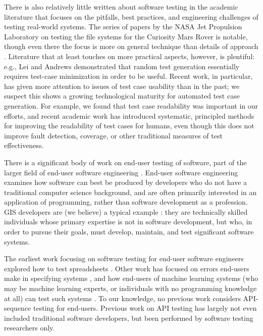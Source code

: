 There is also relatively little written about software testing in the
academic literature that focuses on the pitfalls, best practices, and
engineering challenges of testing real-world systems.  The series of
papers by the NASA Jet Propulsion Laboratory on testing the file
systems for the Curiosity Mars Rover is notable, though even there the
focus is more on general technique than details of approach
\cite{ICSEDiff,CFV08,AMAI}.  Literature that at least touches on more
practical aspects, however, is plentiful: e.g., Lei and Andrews
\cite{MinUnit} demonstrated that random test generation essentially
requires test-case minimization \cite{DD} in order to be useful.
Recent work, in particular, has given more attention to issues of test case usability
than in the past; we suspect this shows a growing technological
maturity for automated test case generation.  For example, we found
that test case readability was important in our efforts, and recent
academic work \cite{Readable,Guava} has introduced systematic,
principled methods for improving the readability of test cases for
humans, even though this does not improve fault detection, coverage,
or other traditional measures of test effectiveness.

There is a significant body of work on end-user testing of software,
part of the larger field of end-user software engineering
\cite{burnettEUSE,Silos}.  End-user software engineering examines how
software can best be produced by developers who do not have a
traditional computer science background, and are often primarily
interested in an application of programming, rather than software
development as a profession.  GIS developers are (we believe) a
typical example \cite{Segal07}:  they are technically skilled  individuals whose
primary expertise is not in software development, but who, in order to
pursue their goals, must develop, maintain, and test significant
software systems.

The earliest work focusing on software testing for
end-user software engineers explored how to test spreadsheets
\cite{rothermelTOSEM,rothermel2000wysiwyt}.  Other work has focused on
errors end-users make in specifying systems \cite{Phalgune}, and how
end-users of machine learning systems (who may be machine learning
experts, or individuals with no programming knowledge at all) can test
such systems \cite{OnlyOracle,kulesza-eud11,shinsel-vlhcc}.  To our
knowledge, no previous work considers API-sequence testing for
end-users.  Previous work on API testing has largely not even included
traditional software developers, but been performed by software
testing researchers only.

